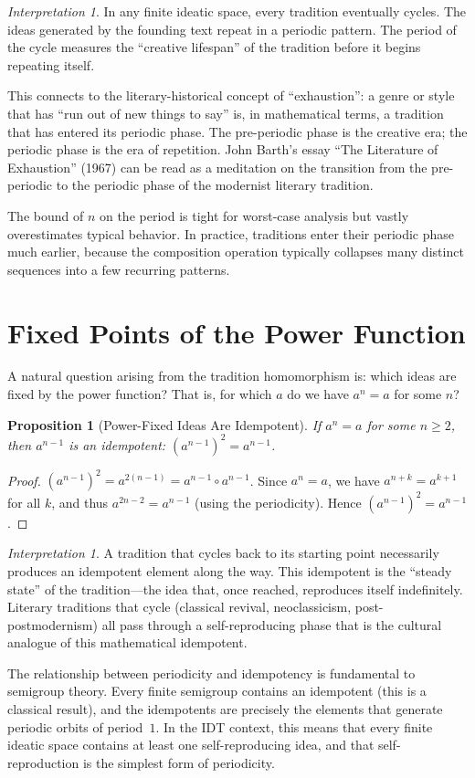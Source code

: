 \documentclass[11pt,openany]{book}
\theoremstyle{definition}
\theoremstyle{plain}
\newtheorem{proposition}[axiom]{Proposition}
\theoremstyle{remark}
\newtheorem{interpretation}[axiom]{Interpretation}
\newcommand{\compose}{\circ}                 %
\begin{document}
\begin{interpretation}
In any finite ideatic space, every tradition eventually cycles. The ideas generated by the founding text repeat in a periodic pattern. The period of the cycle measures the ``creative lifespan'' of the tradition before it begins repeating itself.

This connects to the literary-historical concept of ``exhaustion'': a genre or style that has ``run out of new things to say'' is, in mathematical terms, a tradition that has entered its periodic phase. The pre-periodic phase is the creative era; the periodic phase is the era of repetition. John Barth's essay ``The Literature of Exhaustion'' (1967) can be read as a meditation on the transition from the pre-periodic to the periodic phase of the modernist literary tradition.

The bound of $n$ on the period is tight for worst-case analysis but vastly overestimates typical behavior. In practice, traditions enter their periodic phase much earlier, because the composition operation typically collapses many distinct sequences into a few recurring patterns.
\end{interpretation}

\section{Fixed Points of the Power Function}

A natural question arising from the tradition homomorphism is: which ideas are fixed by the power function? That is, for which $a$ do we have $a^n = a$ for some $n$?

\begin{proposition}[Power-Fixed Ideas Are Idempotent]
If $a^n = a$ for some $n \geq 2$, then $a^{n-1}$ is an idempotent: $(a^{n-1})^2 = a^{n-1}$.
\end{proposition}

\begin{proof}
$(a^{n-1})^2 = a^{2(n-1)} = a^{n-1} \compose a^{n-1}$. Since $a^n = a$, we have $a^{n+k} = a^{k+1}$ for all $k$, and thus $a^{2n-2} = a^{n-1}$ (using the periodicity). Hence $(a^{n-1})^2 = a^{n-1}$.
\end{proof}

\begin{interpretation}
A tradition that cycles back to its starting point necessarily produces an idempotent element along the way. This idempotent is the ``steady state'' of the tradition---the idea that, once reached, reproduces itself indefinitely. Literary traditions that cycle (classical revival, neoclassicism, post-postmodernism) all pass through a self-reproducing phase that is the cultural analogue of this mathematical idempotent.

The relationship between periodicity and idempotency is fundamental to semigroup theory. Every finite semigroup contains an idempotent (this is a classical result), and the idempotents are precisely the elements that generate periodic orbits of period~$1$. In the IDT context, this means that every finite ideatic space contains at least one self-reproducing idea, and that self-reproduction is the simplest form of periodicity.
\end{interpretation}
\end{document}
